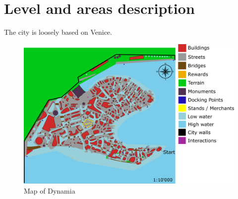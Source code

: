 \section{Level and areas description}

The city is loosely based on Venice.

\begin{center}
  \begin{figure}[H]
    \centering
    \includegraphics[width=\textwidth]{Images/Maps/dynamia}
    \caption{Map of Dynamia}
  \end{figure}
\end{center}

\newpage

